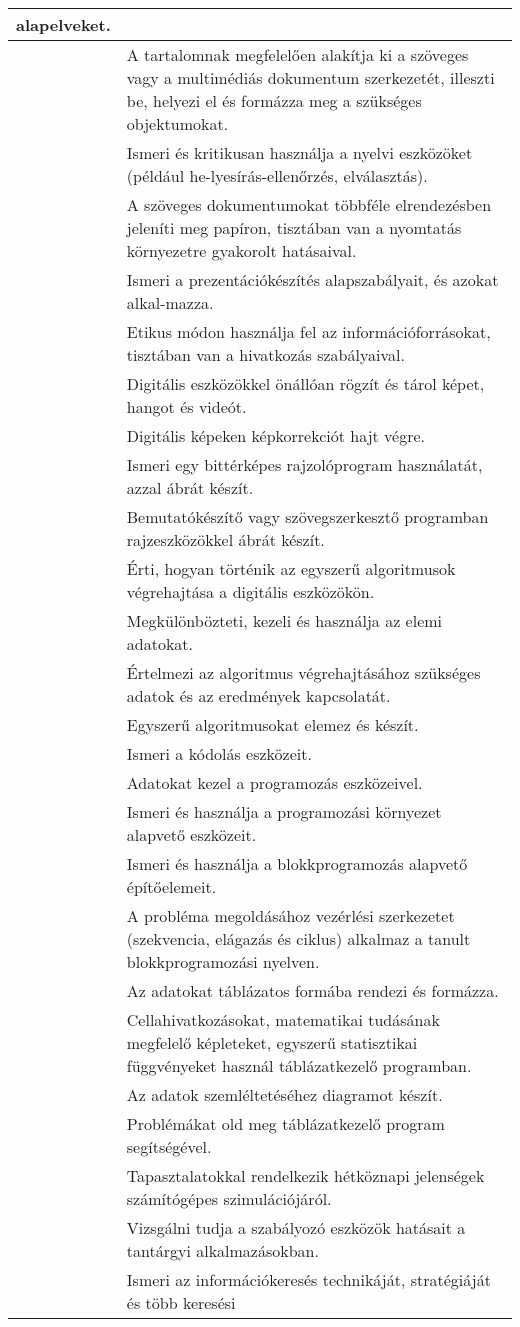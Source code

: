 \begin{longtable}[]{p{\evflength}@{\strut}>{\begin{minipage}{\columnlength}\strut}l<{\strut\end{minipage}}}
  alapelveket.
\tabularnewline
\hline
&
  A tartalomnak megfelelően alakítja ki a szöveges vagy a multimédiás
  dokumentum szerkezetét, illeszti be, helyezi el és formázza meg a
  szükséges objektumokat.
\tabularnewline
\hline
&
  Ismeri és kritikusan használja a nyelvi eszközöket (például
  he-\break lyesírás-ellenőrzés, elválasztás).
\tabularnewline
\hline
&
  A szöveges dokumentumokat többféle elrendezésben jeleníti meg papíron,
  tisztában van a nyomtatás környezetre gyakorolt hatásaival.
\tabularnewline
\hline
&
  Ismeri a prezentációkészítés alapszabályait, és azokat alkal-\break mazza.
\tabularnewline
\hline
&
  Etikus módon használja fel az információforrásokat, tisztában van a
  hivatkozás szabályaival.
\tabularnewline
\hline
&
  Digitális eszközökkel önállóan rögzít és tárol képet, hangot és
  videót.
\tabularnewline
\hline
&
  Digitális képeken képkorrekciót hajt végre.
\tabularnewline
\hline
&
  Ismeri egy bittérképes rajzolóprogram használatát, azzal ábrát készít.
\tabularnewline
\hline
&
  Bemutatókészítő vagy szövegszerkesztő programban rajzeszközökkel
  ábrát készít.
\tabularnewline
\hline
&
  Érti, hogyan történik az egyszerű algoritmusok végrehajtása a
  digitális eszközökön.
\tabularnewline
\hline
&
  Megkülönbözteti, kezeli és használja az elemi adatokat.
\tabularnewline
\hline
&
  Értelmezi az algoritmus végrehajtásához szükséges adatok és az
  eredmények kapcsolatát.
\tabularnewline
\hline
&
  Egyszerű algoritmusokat elemez és készít.
\tabularnewline
\hline
&
  Ismeri a kódolás eszközeit.
\tabularnewline
\hline
&
  Adatokat kezel a programozás eszközeivel.
\tabularnewline
\hline
&
  Ismeri és használja a programozási környezet alapvető eszközeit.
\tabularnewline
\hline
&
  Ismeri és használja a blokkprogramozás alapvető építőelemeit.
\tabularnewline
\hline
&
  A probléma megoldásához vezérlési szerkezetet (szekvencia, elágazás és
  ciklus) alkalmaz a tanult blokkprogramozási nyelven.
\tabularnewline
\hline
&
  Az adatokat táblázatos formába rendezi és formázza.
\tabularnewline
\hline
&
  Cellahivatkozásokat, matematikai tudásának megfelelő képleteket,
  egyszerű statisztikai függvényeket használ táblázatkezelő programban.
\tabularnewline
\hline
&
  Az adatok szemléltetéséhez diagramot készít.
\tabularnewline
\hline
&
  Problémákat old meg táblázatkezelő program segítségével.
\tabularnewline
\hline
&
  Tapasztalatokkal rendelkezik hétköznapi jelenségek számítógépes
  szimulációjáról.
\tabularnewline
\hline
&
  Vizsgálni tudja a szabályozó eszközök hatásait a tantárgyi
  alkalmazásokban.
\tabularnewline
\hline
&
  Ismeri az információkeresés technikáját, stratégiáját és több keresési

\end{longtable}
